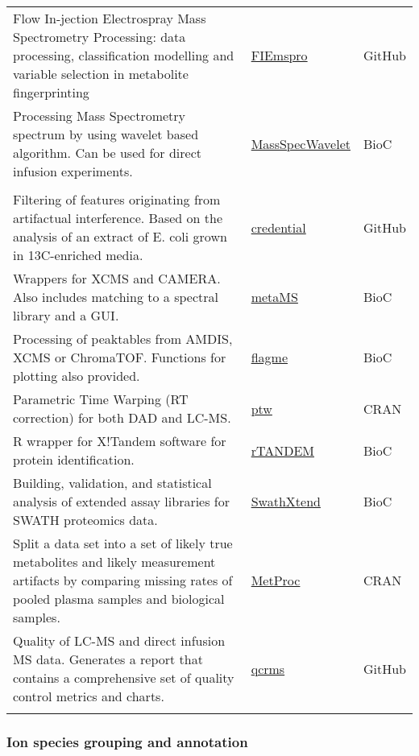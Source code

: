 \documentclass[]{article}
\begin{document}
\begin{longtable}{>{\raggedright\arraybackslash}p{30em}>{\raggedright\arraybackslash}p{10em}>{\raggedright\arraybackslash}p{3em}}
Flow In-jection Electrospray Mass Spectrometry Processing: data processing, classification modelling and variable selection in metabolite fingerprinting & \href{https://github.com/aberHRML/FIEmspro}{FIEmspro} & GitHub\\
\rowcolor{gray!6}  Processing Mass Spectrometry spectrum by using wavelet based algorithm. Can be used for direct infusion experiments. & \href{http://bioconductor.org/packages/release/bioc/html/MassSpecWavelet.html}{MassSpecWavelet} & BioC\\
\addlinespace[0.3em]
\multicolumn{3}{l}{\textbf{Other}}\\
Filtering of features originating from artifactual interference. Based on the analysis of an extract of E. coli grown in 13C-enriched media. & \href{https://github.com/pattilab/credential}{credential} & GitHub\\
\rowcolor{gray!6}  Wrappers for XCMS and CAMERA. Also includes matching to a spectral library and a GUI. & \href{https://doi.org/doi:10.18129/B9.bioc.metaMS}{metaMS} & BioC\\
Processing of peaktables from AMDIS, XCMS or ChromaTOF. Functions for plotting also provided. & \href{https://doi.org/doi:10.18129/B9.bioc.flagme}{flagme} & BioC\\
\rowcolor{gray!6}  Parametric Time Warping (RT correction) for both DAD and LC-MS. & \href{https://cran.r-project.org/package=ptw}{ptw} & CRAN\\
R wrapper for X!Tandem software for protein identification. & \href{http://bioconductor.org/packages/release/bioc/html/rTANDEM.html}{rTANDEM} & BioC\\
\rowcolor{gray!6}  Building, validation, and statistical analysis of extended assay libraries for SWATH proteomics data. & \href{https://bioconductor.org/packages/release/bioc/html/SwathXtend.html}{SwathXtend} & BioC\\
Split a data set into a set of likely true metabolites and likely measurement artifacts by comparing missing rates of pooled plasma samples and biological samples. & \href{https://cran.r-project.org/package=MetProc}{MetProc} & CRAN\\
\rowcolor{gray!6}  Quality of LC-MS and direct infusion MS data. Generates a report that contains a comprehensive set of quality control metrics and charts. & \href{https://github.com/computational-metabolomics/qcrms}{qcrms} & GitHub\\*
\end{longtable}

\hypertarget{ion-species-grouping-and-annotation}{%
\subsubsection{Ion species grouping and annotation}\label{ion-species-grouping-and-annotation}}
\end{document}
